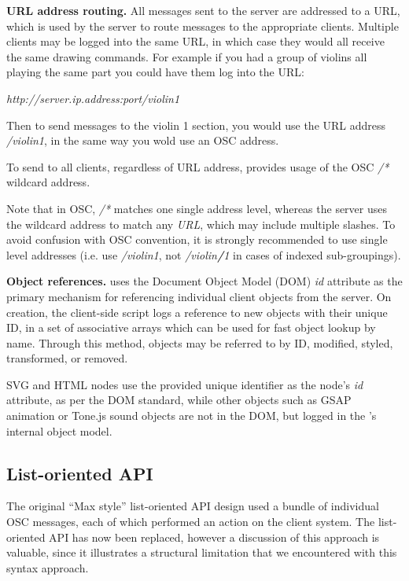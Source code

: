 \medskip
\noindent
\textbf{URL address routing.}  
All messages sent to the server are addressed to a URL, which is used by the server to route messages to the appropriate clients. 
Multiple clients may be logged into the same URL, in which case they would all receive the same drawing commands. 
For example if you had a group of violins all playing the same part you could have them log into the URL:

\textit{http://server.ip.address:port/violin1}

Then to send messages to the violin 1 section, you would use the URL address \textit{/violin1}, in the same way you wold use an OSC address.

To send to all clients, regardless of URL address, \drawsocket provides usage of the OSC \textit{/*} wildcard address.

Note that in OSC, \textit{/*} matches one single address level, whereas the \drawsocket server uses the wildcard address to match any \textit{URL}, which may include multiple slashes.
To avoid confusion with OSC convention, it is strongly recommended to use single level addresses (i.e. use \textit{/violin1}, not \textit{/violin\textbf{/}1} in cases of indexed sub-groupings).

\medskip
\noindent
\textbf{Object references.} 
\drawsocket uses the Document Object Model (DOM)\cite{Champion:04:DOM} \textit{id} attribute as the primary mechanism for referencing individual client objects from the server.
On creation, the client-side script logs a reference to new objects with their unique ID, in a set of associative arrays which can be used for fast object lookup by name. 
Through this method, objects may be referred to by ID, modified, styled, transformed, or removed.

SVG and HTML nodes use the provided unique identifier as the node's \textit{id} attribute, as per the DOM standard, while other objects such as GSAP animation or Tone.js sound objects are not in the DOM, but logged in the \drawsocket's internal object model.

\subsection{List-oriented API}\label{sec:maxstyle}
The original ``Max style'' list-oriented  \drawsocket API design used a bundle of individual OSC messages, each of which performed an action on the client system. 
The list-oriented API has now been replaced, however a discussion of this approach is valuable, since it illustrates a structural limitation that we encountered with this syntax approach.

